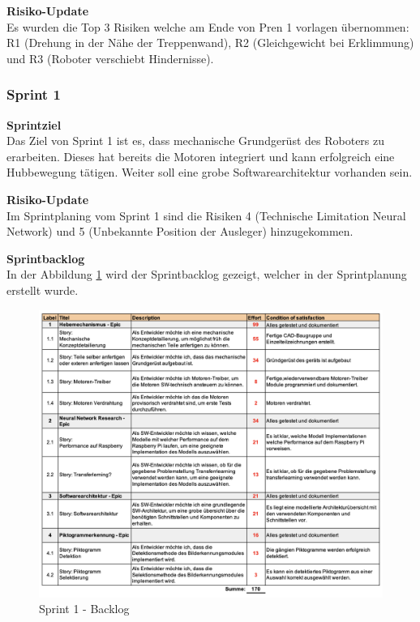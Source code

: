 \textbf{Risiko-Update}\\
Es wurden die Top 3 Risiken welche am Ende von Pren 1 vorlagen übernommen: R1 (Drehung in der Nähe der Treppenwand), R2 (Gleichgewicht bei Erklimmung) und R3 (Roboter verschiebt Hindernisse).

\subsubsection{Sprint 1}
\textbf{Sprintziel}\\
Das Ziel von Sprint 1 ist es, dass mechanische Grundgerüst des Roboters zu erarbeiten. Dieses hat bereits die Motoren integriert und kann erfolgreich eine Hubbewegung tätigen. Weiter soll eine grobe Softwarearchitektur vorhanden sein.

\textbf{Risiko-Update}\\
Im Sprintplaning vom Sprint 1 sind die Risiken 4 (Technische Limitation Neural Network) und 5 (Unbekannte Position der Ausleger) hinzugekommen. 

\textbf{Sprintbacklog}\\
In der Abbildung \ref{fig:sprint-backlog-1} wird der Sprintbacklog gezeigt, welcher in der Sprintplanung erstellt wurde.
\begin{figure}[H]
  \includegraphics[width=1.0\textwidth]{img/projektmanagement/Sprint 1.png}
  \centering
  \caption{Sprint 1 - Backlog}
  \label{fig:sprint-backlog-1}
\end{figure}

\newpage

